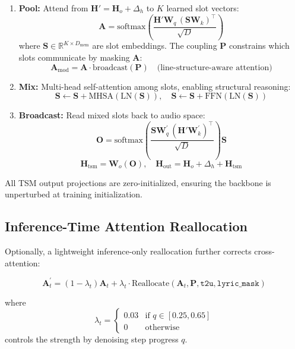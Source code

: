\documentclass[11pt,a4paper]{article}
\begin{document}
\begin{enumerate}
    \item \textbf{Pool:} Attend from $\mathbf{H}' = \mathbf{H}_o + \Delta_h$ to $K$ learned slot vectors:
    \[
    \mathbf{A} = \text{softmax}\!\left(\frac{\mathbf{H}' \mathbf{W}_q \, (\mathbf{S} \mathbf{W}_k)^\top}{\sqrt{D}}\right)
    \]
    where $\mathbf{S} \in \mathbb{R}^{K \times D_{\text{mem}}}$ are slot embeddings. The coupling $\mathbf{P}$ constrains which slots communicate by masking $\mathbf{A}$:
    \[
    \mathbf{A}_{\text{mod}} = \mathbf{A} \cdot \text{broadcast}(\mathbf{P}) \quad\text{(line-structure-aware attention)}
    \]

    \item \textbf{Mix:} Multi-head self-attention among slots, enabling structural reasoning:
    \[
    \mathbf{S} \leftarrow \mathbf{S} + \text{MHSA}(\text{LN}(\mathbf{S})), \quad
    \mathbf{S} \leftarrow \mathbf{S} + \text{FFN}(\text{LN}(\mathbf{S}))
    \]

    \item \textbf{Broadcast:} Read mixed slots back to audio space:
    \[
    \mathbf{O} = \text{softmax}\!\left(\frac{\mathbf{S} \mathbf{W}_q^{\prime} \, (\mathbf{H}' \mathbf{W}_k^{\prime})^\top}{\sqrt{D}}\right) \mathbf{S}
    \]
    \[
    \mathbf{H}_{\text{tsm}} = \mathbf{W}_o(\mathbf{O}),
    \quad \mathbf{H}_{\text{out}} = \mathbf{H}_o + \Delta_h + \mathbf{H}_{\text{tsm}}
    \]
\end{enumerate}

All TSM output projections are zero-initialized, ensuring the backbone is unperturbed at training initialization.

\subsection{Inference-Time Attention Reallocation}

Optionally, a lightweight inference-only reallocation further corrects cross-attention:

\begin{equation}
\mathbf{A}^{\prime}_{t} = (1 - \lambda_t) \mathbf{A}_t + \lambda_t \cdot \text{Reallocate}(\mathbf{A}_t, \mathbf{P}, \texttt{t2u}, \texttt{lyric\_mask})
\end{equation}

where
\[
\lambda_t = \begin{cases}
0.03 & \text{if } q \in [0.25, 0.65]\\
0 & \text{otherwise}
\end{cases}
\]
controls the strength by denoising step progress $q$.
\end{document}
